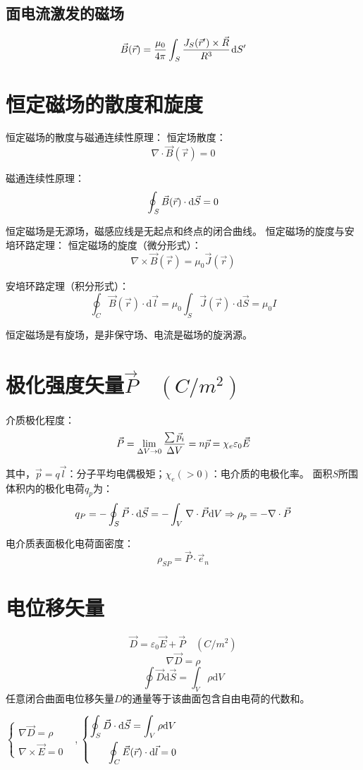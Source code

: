 \subsection*{面电流激发的磁场}
$$\vec B(\vec r) = {{{\mu _0}} \over {4{\rm{\pi }}}}\int_{{\kern 1pt} S} {{{{J_S}{\rm{(}}\vec r') \times \vec R} \over {{R^3}}}{\kern 1pt} } {\rm{d}}S'$$

\section{恒定磁场的散度和旋度}
恒定磁场的散度与磁通连续性原理：
恒定场散度：$$\nabla \cdot \vec{B}(\vec{r})=0$$

磁通连续性原理：$$\oint_{{\kern 1pt} S} {\vec B(\vec r) \cdot {\rm{d}}\vec S}  = 0$$

恒定磁场是无源场，磁感应线是无起点和终点的闭合曲线。
恒定磁场的旋度与安培环路定理：
恒定磁场的旋度（微分形式）：$$\nabla \times \vec{B}(\vec{r}) = \mu_0\vec{J}(\vec{r})$$

安培环路定理（积分形式）：$$\oint_C\vec{B}(\vec{r}) \cdot \mathrm{d} \vec{l}  = \mu_0\int_{S} \vec{J}(\vec r) \cdot \mathrm{d} \vec S  = \mu_0I$$

恒定磁场是有旋场，是非保守场、电流是磁场的旋涡源。

\section{极化强度矢量$\vec{P}\quad(C/m^2)$}
介质极化程度：$$\vec P=\mathop {{\rm{lim}}}\limits_{\Delta V \to 0} {{\sum {{{\vec p}_i}} } \over {\Delta V}} = n\vec p=\chi_e\varepsilon_0\vec{E}$$

其中，$\vec{p}=q\vec{l}$：分子平均电偶极矩；$\chi_e(>0)$：电介质的电极化率。
面积$S$所围体积内的极化电荷$q_p$为：
$${q_P} =  - \oint_{S} {\vec P \cdot {\rm{d}}\vec S}  =  - \int_{V} {{\kern 1pt} \nabla  \cdot \vec P{\rm{d}}V} \Rightarrow \rho_p = -\nabla\cdot\vec{P}$$

电介质表面极化电荷面密度：$$\rho_{SP} = \vec P \cdot \vec e_{n}$$

\section{电位移矢量}
$$\vec{D}=\varepsilon_0\vec{E} + \vec{P}\quad(C/m^2)$$
$$\nabla\vec{D}=\rho$$
$$\oint\vec{D}\mathrm{d}\vec{S}=\int_V\rho\mathrm{d}V$$
任意闭合曲面电位移矢量$D$的通量等于该曲面包含自由电荷的代数和。
\begin{center}
	$\left\{ 
	\begin{aligned}
	\nabla\vec{D}=\rho& \\ 
	\nabla \times \vec{E}=0&
	\end{aligned}
	\right.$,\qquad
	$\left\{ 
	\begin{aligned}
	\oint_S {\vec D \cdot {\rm{d}}\vec S}  = \int_V {\rho {\rm{d}}V} \\
	\oint_C {\vec E{\rm{(}}\vec r{\rm{)}} \cdot {\rm{d}}\vec l}  = 0
	\end{aligned}
	\right.$
\end{center}

